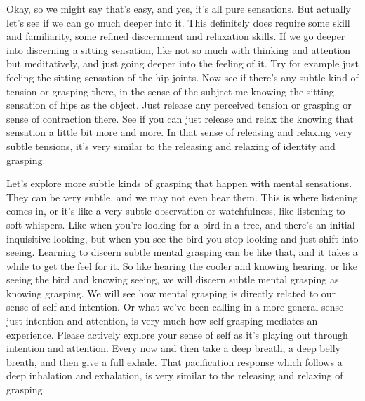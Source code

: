 \documentclass[12pt,openany]{book}
\begin{document}
Okay, so we might say that's easy, and yes, it's all pure sensations. But actually let's see if we can go much deeper into it. This definitely does require some skill and familiarity, some refined discernment and relaxation skills. If we go deeper into discerning a sitting sensation, like not so much with thinking and attention but meditatively, and just going deeper into the feeling of it. Try for example just feeling the sitting sensation of the hip joints. Now see if there's any subtle kind of tension or grasping there, in the sense of the subject me knowing the sitting sensation of hips as the object. Just release any perceived tension or grasping or sense of contraction there. See if you can just release and relax the knowing that sensation a little bit more and more. In that sense of releasing and relaxing very subtle tensions, it's very similar to the releasing and relaxing of identity and grasping.

Let's explore more subtle kinds of grasping that happen with mental sensations. They can be very subtle, and we may not even hear them. This is where listening comes in, or it’s like a very subtle observation or watchfulness, like listening to soft whispers. Like when you’re looking for a bird in a tree, and there's an initial inquisitive looking, but when you see the bird you stop looking and just shift into seeing. Learning to discern subtle mental grasping can be like that, and it takes a while to get the feel for it. So like hearing the cooler and knowing hearing, or like seeing the bird and knowing seeing, we will discern subtle mental grasping as knowing grasping. We will see how mental grasping is directly related to our sense of self and intention. Or what we’ve been calling in a more general sense just intention and attention, is very much how self grasping mediates an experience. Please actively explore your sense of self as it's playing out through intention and attention. Every now and then take a deep breath, a deep belly breath, and then give a full exhale. That pacification response which follows a deep inhalation and exhalation, is very similar to the releasing and relaxing of grasping.
\end{document}
